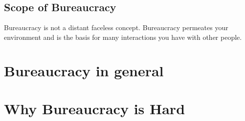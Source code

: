 \documentclass{book}
\begin{document}
  

  \clearpage 
  \section{Scope of Bureaucracy}
  Bureaucracy is not a distant faceless concept. Bureaucracy permeates your environment and is the basis for many interactions you have with other people. 

  \clearpage
    
    
    
     
  \clearpage
  \clearpage %

\chapter{Bureaucracy in general\label{sec:bureaucracy-in-general}}
   
  \clearpage
   
  \clearpage
  \clearpage
  \clearpage
  \clearpage 
  \clearpage
  
  
  \clearpage
   
  \clearpage
  
  \clearpage
   
  \clearpage

\chapter{Why Bureaucracy is Hard}
  \clearpage
  \clearpage
  \clearpage


\end{document}
